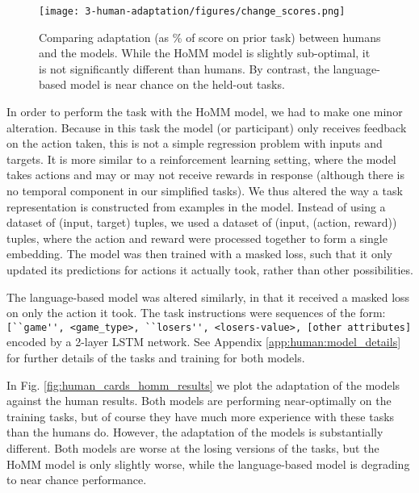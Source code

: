 \begin{figure}
\centering
\texttt{[image: 3-human-adaptation/figures/change\_scores.png]}
\caption{Comparing adaptation (as \% of score on prior task) between humans and the models. While the HoMM model is slightly sub-optimal, it is not significantly different than humans. By contrast, the language-based model is near chance on the held-out tasks.} \label{fig:human_cards_homm_change_scores}
\end{figure}
In order to perform the task with the HoMM model, we had to make one minor alteration. Because in this task the model (or participant) only receives feedback on the action taken, this is not a simple regression problem with inputs and targets. It is more similar to a reinforcement learning setting, where the model takes actions and may or may not receive rewards in response (although there is no temporal component in our simplified tasks). We thus altered the way a task representation is constructed from examples in the model. Instead of using a dataset of (input, target) tuples, we used a dataset of (input, (action, reward)) tuples, where the action and reward were processed together to form a single embedding. The model was then trained with a masked loss, such that it only updated its predictions for actions it actually took, rather than other possibilities. \par
The language-based model was altered similarly, in that it received a masked loss on only the action it took. The task instructions were sequences of the form:\\\verb|[``game'', <game_type>, ``losers'', <losers-value>, [other attributes]| encoded by a 2-layer LSTM network. See Appendix \ref{app:human:model_details} for further details of the tasks and training for both models.\par
In Fig. \ref{fig:human_cards_homm_results} we plot the adaptation of the models against the human results. Both models are performing near-optimally on the training tasks, but of course they have much more experience with these tasks than the humans do. However, the adaptation of the models is substantially different. Both models are worse at the losing versions of the tasks, but the HoMM model is only slightly worse, while the language-based model is degrading to near chance performance. \par
